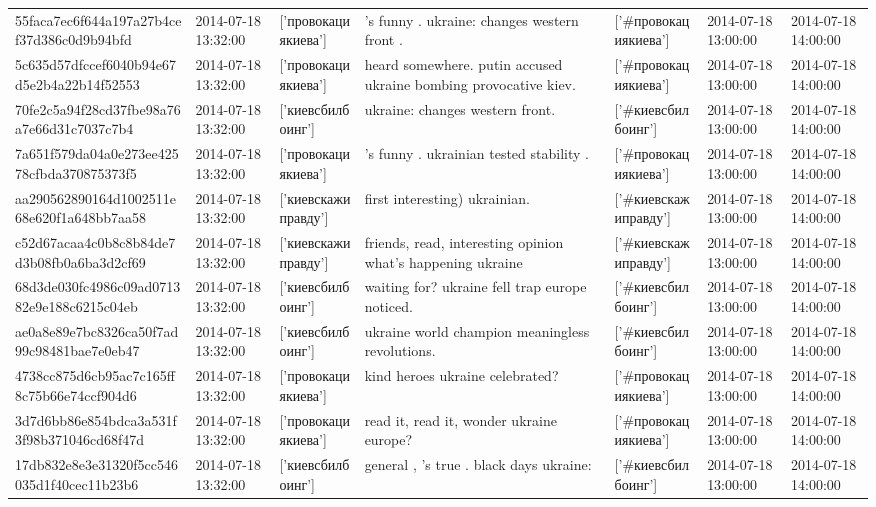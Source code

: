 \begin{tabular}{lllllll}
55faca7ec6f644a197a27b4cef37d386c0d9b94bfd & 2014-07-18 13:32:00 & ['провокациякиева'] & 's funny . ukraine: changes western front . & ['#провокациякиева'] & 2014-07-18 13:00:00 & 2014-07-18 14:00:00 \\
5c635d57dfccef6040b94e67d5e2b4a22b14f52553 & 2014-07-18 13:32:00 & ['провокациякиева'] & heard somewhere. putin accused ukraine bombing provocative kiev. & ['#провокациякиева'] & 2014-07-18 13:00:00 & 2014-07-18 14:00:00 \\
70fe2c5a94f28cd37fbe98a76a7e66d31c7037c7b4 & 2014-07-18 13:32:00 & ['киевсбилбоинг'] & ukraine: changes western front. & ['#киевсбилбоинг'] & 2014-07-18 13:00:00 & 2014-07-18 14:00:00 \\
7a651f579da04a0e273ee42578cfbda370875373f5 & 2014-07-18 13:32:00 & ['провокациякиева'] & 's funny . ukrainian tested stability . & ['#провокациякиева'] & 2014-07-18 13:00:00 & 2014-07-18 14:00:00 \\
aa290562890164d1002511e68e620f1a648bb7aa58 & 2014-07-18 13:32:00 & ['киевскажиправду'] & first interesting) ukrainian. & ['#киевскажиправду'] & 2014-07-18 13:00:00 & 2014-07-18 14:00:00 \\
c52d67acaa4c0b8c8b84de7d3b08fb0a6ba3d2cf69 & 2014-07-18 13:32:00 & ['киевскажиправду'] & friends, read, interesting opinion what's happening ukraine & ['#киевскажиправду'] & 2014-07-18 13:00:00 & 2014-07-18 14:00:00 \\
68d3de030fc4986c09ad071382e9e188c6215c04eb & 2014-07-18 13:32:00 & ['киевсбилбоинг'] & waiting for? ukraine fell trap europe noticed. & ['#киевсбилбоинг'] & 2014-07-18 13:00:00 & 2014-07-18 14:00:00 \\
ae0a8e89e7bc8326ca50f7ad99c98481bae7e0eb47 & 2014-07-18 13:32:00 & ['киевсбилбоинг'] & ukraine world champion meaningless revolutions. & ['#киевсбилбоинг'] & 2014-07-18 13:00:00 & 2014-07-18 14:00:00 \\
4738cc875d6cb95ac7c165ff8c75b66e74ccf904d6 & 2014-07-18 13:32:00 & ['провокациякиева'] & kind heroes ukraine celebrated? & ['#провокациякиева'] & 2014-07-18 13:00:00 & 2014-07-18 14:00:00 \\
3d7d6bb86e854bdca3a531f3f98b371046cd68f47d & 2014-07-18 13:32:00 & ['провокациякиева'] & read it, read it, wonder ukraine europe? & ['#провокациякиева'] & 2014-07-18 13:00:00 & 2014-07-18 14:00:00 \\
17db832e8e3e31320f5cc546035d1f40cec11b23b6 & 2014-07-18 13:32:00 & ['киевсбилбоинг'] & general , 's true . black days ukraine: & ['#киевсбилбоинг'] & 2014-07-18 13:00:00 & 2014-07-18 14:00:00 \\

\end{tabular}
